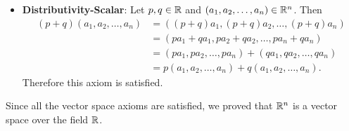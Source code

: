 \begin{example}
\begin{itemize}
        \item \textbf{Distributivity-Scalar}: Let $p, q \in \mathbb{R}$ and $(a_1, a_2, \dots, a_n) \in \mathbb{R}^n$. Then
        \begin{align*}
            (p+q)(a_1, a_2, \dots, a_n) &= ((p+q)a_1, (p+q)a_2, \dots, (p+q)a_n)\\
            &= (pa_1 + qa_1, pa_2 + qa_2, \dots, pa_n + qa_n)\\
            &= (pa_1, pa_2, \dots, pa_n) + (qa_1, qa_2, \dots, qa_n)\\
            &= p(a_1, a_2, \dots, a_n) + q(a_1, a_2, \dots, a_n).
        \end{align*}
        Therefore this axiom is satisfied.
    \end{itemize}
    
    Since all the vector space axioms are satisfied, we proved that $\mathbb{R}^n$ is a vector space over the field $\mathbb{R}$.
\end{example}

